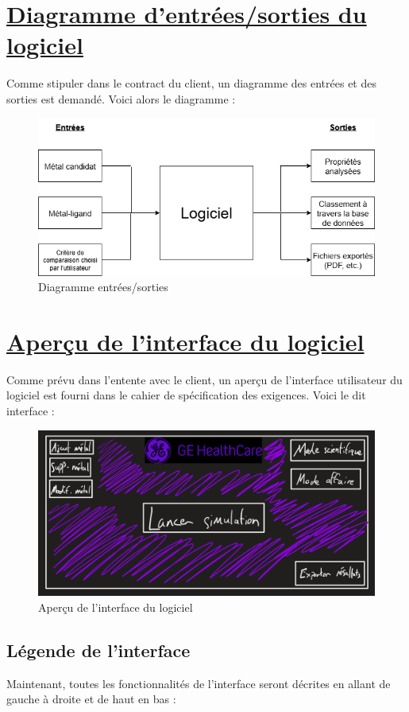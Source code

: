 \documentclass[11pt]{article}
\begin{document}
\section{\underline{Diagramme d'entrées/sorties du logiciel}}
Comme stipuler dans le contract du client, un diagramme des entrées et des sorties est demandé. Voici alors le diagramme :

\begin{figure}[h!]
  \includegraphics[width=\linewidth]{diagramme.png}
  \caption{Diagramme entrées/sorties}
\end{figure}
\pagebreak


\section{\underline{Aperçu de l'interface du logiciel}}
Comme prévu dans l'entente avec le client, un aperçu de l'interface utilisateur du logiciel est fourni dans le cahier de spécification des exigences. Voici le dit interface :

\begin{figure}[h!]
  \includegraphics[width=\linewidth]{interface.png}
  \caption{Aperçu de l'interface du logiciel}
\end{figure}

\subsection{Légende de l'interface}
Maintenant, toutes les fonctionnalités de l'interface seront décrites en allant de gauche à droite et de haut en bas :
\end{document}
